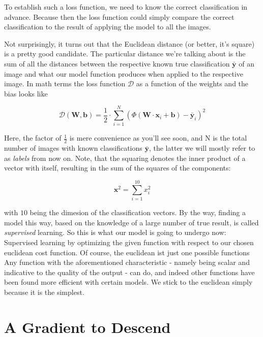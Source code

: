 \documentclass[]{report}
\begin{document}
To establish such a loss function, we need to know the correct classification in advance. Because then the loss function could simply compare the correct classification to the result of applying the model to all the images.

Not surprisingly, it turns out that the Euclidean distance (or better, it's square) is a pretty good candidate. The particular distance we're talking about is the sum of all the distances between the respective known true classification \(\mathbf{\bar{y}} \) of an image and what our model function produces when applied to the respective image. In math terms the loss function \(\mathcal{D}\) as a function of the weights and the bias looks like

\begin{equation} \label{eq:60}
\mathcal{D}( \mathbf{W}, \mathbf{b}) = \frac{1}{2} \cdot \sum_{i=1}^{N}
(\Phi(\mathbf{W} \cdot \mathbf{x}_i + \mathbf{b}) - \mathbf{\bar{y}}_i)^2
\end{equation}

Here, the factor of \(\frac{1}{2} \) is mere convenience as you'll see soon, and N is the total number of images with known classifications \(\mathbf{\bar{y}} \), the latter we will mostly refer to as \emph{labels} from now on. Note, that the squaring denotes the inner product of a vector with itself, resulting in the sum of the squares of the components:

\begin{equation}
	\mathbf{x}^2 = \sum_{i=1}^{10}x_i^2
\end{equation}

with \(10\) being the dimesion of the classification vectors. By the way, finding a model this way, based on the knowledge of a large number of true result, is called \emph{supervised} learning. So this is what our model is going to undergo now: Supervised learning by optimizing the given function with respect to our chosen euclidean cost function. Of course, the euclidean ist just one possible functions Any function with the aforementioned characteristic - namely being scalar and indicative to the quality of the output - can do, and indeed other functions have been found more efficient with certain models. We stick to the euclidean simply because it is the simplest.

\bigskip

\chapter{A Gradient to Descend }
\end{document}
